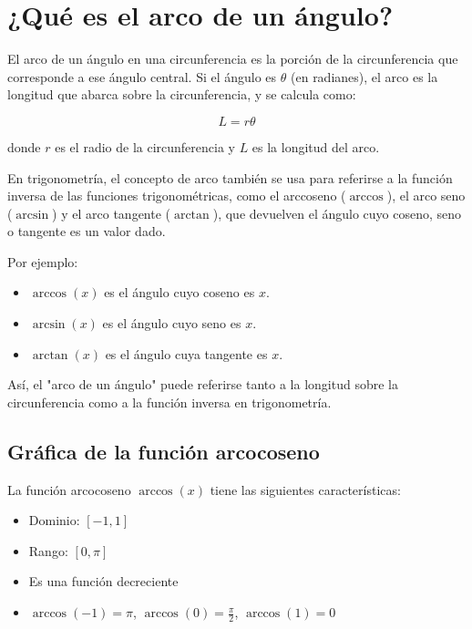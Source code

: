 \section{¿Qué es el arco de un ángulo?}\label{sec:arco}

El arco de un ángulo en una circunferencia es la porción de la circunferencia que corresponde a ese ángulo central. Si el ángulo es $\theta$ (en radianes), el arco es la longitud que abarca sobre la circunferencia, y se calcula como:

\begin{equation}\label{eq:longitud_arco}
    L = r \theta
\end{equation}

donde $r$ es el radio de la circunferencia y $L$ es la longitud del arco.

En trigonometría, el concepto de arco también se usa para referirse a la función inversa de las funciones trigonométricas, como el arccoseno ($\arccos$), el arco seno ($\arcsin$) y el arco tangente ($\arctan$), que devuelven el ángulo cuyo coseno, seno o tangente es un valor dado.

Por ejemplo:
\begin{itemize}
    \item $\arccos(x)$ es el ángulo cuyo coseno es $x$.
    \item $\arcsin(x)$ es el ángulo cuyo seno es $x$.
    \item $\arctan(x)$ es el ángulo cuya tangente es $x$.
\end{itemize}

Así, el "arco de un ángulo" puede referirse tanto a la longitud sobre la circunferencia como a la función inversa en trigonometría.

\subsection{Gráfica de la función arcocoseno}

La función arcocoseno $\arccos(x)$ tiene las siguientes características:
\begin{itemize}
    \item Dominio: $[-1, 1]$
    \item Rango: $[0, \pi]$
    \item Es una función decreciente
    \item $\arccos(-1) = \pi$, $\arccos(0) = \frac{\pi}{2}$, $\arccos(1) = 0$
\end{itemize}

